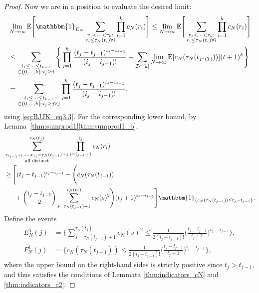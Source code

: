 \documentclass[12pt,authoryear]{article}
\theoremstyle{definition}
\newcommand{\E}{\mathbb{E}}
\newcommand{\1}[1]{\mathbbm{1}_{#1}}
\begin{document}
\begin{proof}
Now we are in a position to evaluate the desired limit: 
\begin{align*}
&\lim_{N\to\infty} \E \Bigg[ \1{E_N} 
        \sum_{\substack{r_1<\dots<r_k :\\ r_i\leq \tau_N(t_i) \forall i}} 
        \prod_{i=1}^k c_N(r_i) \Bigg] 
\leq \lim_{N\to\infty} \E \Bigg[\sum_{\substack{r_1<\dots<r_k :\\ 
        r_i\leq \tau_N(t_i) \forall i}} \prod_{i=1}^k c_N(r_i) \Bigg] \\
&\leq \sum_{\substack{i_1\leq \dots\leq i_{k-1}\\ \in \{0,\dots,k\} :
        i_j \geq j}} \Bigg\{ \prod_{j=1}^k \frac{(t_j - t_{j-1})^{i_j - i_{j-1}}}
        {(i_j - i_{j-1})!} + \sum_{\mathcal{I} \subset [k]} \lim_{N\to\infty} 
        \E [ c_N(\tau_N(t_{j^\star(\mathcal{I})})) ] 
        (t+1)^k \Bigg\} \\
&= \sum_{\substack{i_1\leq \dots\leq i_{k-1}\\ \in \{0,\dots,k\} : 
        i_j \geq j \forall j}} \prod_{j=1}^k \frac{(t_j - t_{j-1})^{i_j - i_{j-1}}}
        {(i_j - i_{j-1})!},
\end{align*}
using \eqref{eq:BJJK_eq3.3}.
For the corresponding lower bound, by Lemma~\ref{thm:sumprod1}\ref{thm:sumprod1_b},
\begin{align*}
&\sum_{\substack{ r_{i_{j-1}+1}, \ldots, r_{i_j} = \tau_N(t_{j-1})+1 
        \\ \text{all distinct} }}^{\tau_N(t_j)}  
        \prod_{i=i_{j-1}+1}^{i_j} c_N(r_i)  \\ 
&\geq \Bigg[(t_j - t_{j-1})^{i_j - i_{j-1}} - \Bigg(c_N(\tau_N(t_{j - 1}))  \\
        &\phantom{\geq \Bigg[} + \binom{i_j - i_{j-1}}{2} \sum_{s=\tau_N(t_{j-1})+1}^{\tau_N(t_j)}
        c_N(s)^2 \Bigg) ( t_j + 1 )^{i_j - i_{j-1}} \Bigg] \1{\{c_N(\tau_N(t_{j - 1})) \leq t_j - t_{j - 1}\}}.
\end{align*}
Define the events
\begin{align*}
E_N^4(j)
&= \Bigg\{ \sum_{s=\tau_N(t_{j-1})+1}^{\tau_N(t_j)} c_N(s)^2
        \leq \frac{1}{2(i_j - i_{j - 1})!} \Bigg( \frac{ t_j - t_{j-1} }{ t_j +1 }\Bigg)^{i_j - i_{j-1}} \Bigg\}, \\
F_N^4(j)
&= \Bigg\{ c_N(\tau_N(t_{j-1}))
        \leq \frac{1}{2(i_j - i_{j - 1})!} \Bigg( \frac{ t_j - t_{j-1} }{ t_j +1 }\Bigg)^{i_j - i_{j-1}} \Bigg\},    
\end{align*}
where the upper bound on the right-hand sides is strictly positive since $t_j > t_{j - 1}$, and thus satisfies the conditions of Lemmata \ref{thm:indicators_cN} and \ref{thm:indicators_c2}.

\end{proof}
\end{document}
